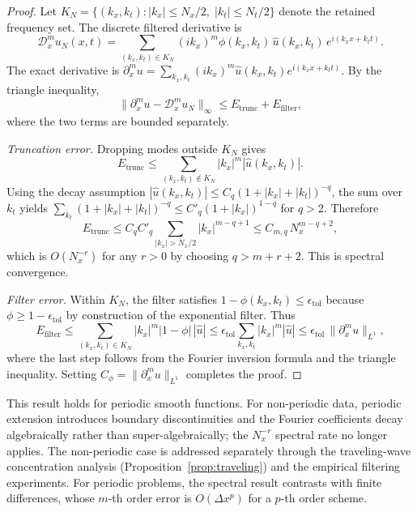 \documentclass[preprint,12pt]{elsarticle}
\begin{document}
\begin{proof}
Let $K_N = \{(k_x,k_t): |k_x|\le N_x/2,\; |k_t|\le N_t/2\}$ denote the retained frequency set. The discrete filtered derivative is
\begin{equation}
\mathcal{D}_x^m u_N(x,t) = \sum_{(k_x,k_t)\in K_N} (ik_x)^m \phi(k_x,k_t)\,\hat{u}(k_x,k_t)\,e^{i(k_x x+k_t t)}.
\end{equation}
The exact derivative is $\partial_x^m u = \sum_{k_x,k_t} (ik_x)^m \hat{u}(k_x,k_t) e^{i(k_x x+k_t t)}$. By the triangle inequality,
\begin{equation}
\|\partial_x^m u - \mathcal{D}_x^m u_N\|_\infty \le E_{\mathrm{trunc}} + E_{\mathrm{filter}},
\end{equation}
where the two terms are bounded separately.

\textit{Truncation error.} Dropping modes outside $K_N$ gives
\begin{equation}
E_{\mathrm{trunc}} \le \sum_{(k_x,k_t)\notin K_N} |k_x|^m |\hat{u}(k_x,k_t)|.
\end{equation}
Using the decay assumption $|\hat{u}(k_x,k_t)|\le C_q(1+|k_x|+|k_t|)^{-q}$, the sum over $k_t$ yields $\sum_{k_t}(1+|k_x|+|k_t|)^{-q}\le C'_q(1+|k_x|)^{1-q}$ for $q>2$. Therefore
\begin{equation}
E_{\mathrm{trunc}} \le C_q C'_q \sum_{|k_x|>N_x/2} |k_x|^{m-q+1} \le C_{m,q}\, N_x^{m-q+2},
\end{equation}
which is $O(N_x^{-r})$ for any $r>0$ by choosing $q>m+r+2$. This is spectral convergence.

\textit{Filter error.} Within $K_N$, the filter satisfies $1-\phi(k_x,k_t)\le \epsilon_{\mathrm{tol}}$ because $\phi\ge 1-\epsilon_{\mathrm{tol}}$ by construction of the exponential filter. Thus
\begin{equation}
E_{\mathrm{filter}} \le \sum_{(k_x,k_t)\in K_N} |k_x|^m |1-\phi|\,|\hat{u}| \le \epsilon_{\mathrm{tol}} \sum_{k_x,k_t} |k_x|^m |\hat{u}| \le \epsilon_{\mathrm{tol}}\,\|\partial_x^m u\|_{L^1},
\end{equation}
where the last step follows from the Fourier inversion formula and the triangle inequality. Setting $C_\phi=\|\partial_x^m u\|_{L^1}$ completes the proof.
\end{proof}

This result holds for periodic smooth functions. For non-periodic data, periodic extension introduces boundary discontinuities and the Fourier coefficients decay algebraically rather than super-algebraically; the $N_x^{-r}$ spectral rate no longer applies. The non-periodic case is addressed separately through the traveling-wave concentration analysis (Proposition~\ref{prop:traveling}) and the empirical filtering experiments. For periodic problems, the spectral result contrasts with finite differences, whose $m$-th order error is $O(\Delta x^p)$ for a $p$-th order scheme.
\end{document}
